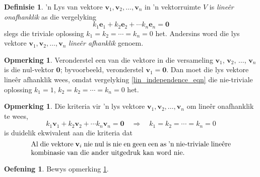 \documentclass[a4paper,11pt]{book}
\theoremstyle{definition}
\newtheorem{definition}[theorem]{Definisie}
\newtheorem{exercise}{Oefening}
\newtheorem{remark}[theorem]{Opmerking}
\newcommand{\be}{\begin{equation}}
\newcommand{\ee}{\end{equation}}
\newcommand{\ve}[1]{\mathbf{#1}}
\begin{document}
\begin{definition} 'n Lys van vektore $\ve{v}_1, \ve{v}_2, \ldots,
	\ve{v}_n$ in 'n vektorruimte $V$ is \emph{line{\^e}r onafhanklik} as
	die vergelyking
	\be \label{lin_independence_eqn}
	k_1 \ve{e}_1 + k_2 \ve{e}_2 + \cdots k_n \ve{e}_n = \ve{0}
	\ee
	slegs die triviale oplossing $k_1 = k_2 = \cdots = k_n = 0$ het.
	Andersins word die lys vektore $\ve{v}_1, \ve{v}_2, \ldots, \ve{v}_n$
	\emph{line{\^e}r afhanklik} genoem.
\end{definition}
\begin{remark} Veronderstel een van die vektore in die versameling
	$\ve{v}_1$, $\ve{v}_2$, $\ldots$, $\ve{v}_n$ is die nul-vektor
	$\ve{0}$; byvoorbeeld, veronderstel $\ve{v}_1 = \ve{0}$. Dan moet die
	lys vektore line{\^e}r afhanklik wees, omdat vergelyking
	\eqref{lin_independence_eqn} die nie-triviale oplossing $k_1 = 1$, $k_2
	= k_2 = \cdots = k_n = 0$ het. \label{remark_about_lin_dependence}
\end{remark}

\begin{remark}
	\label{crit_ind} Die kriteria vir 'n lys vektore $\ve{v}_1, \ve{v}_2,
	\ldots, \ve{v}_n$ om line{\^e}r onafhanklik te wees,
	\[
		k_1 \ve{v}_1 + k_2 \ve{v}_2 + \cdots k_n \ve{v}_n = \ve{0} \quad
		\Rightarrow \quad k_1 = k_2 = \cdots = k_n = 0
	\]
	is duidelik ekwivalent aan die kriteria dat
	\[
		\begin{minipage}{10cm} 
			{ 
			Al die vektore $\ve{v}_i$ nie nul is nie en geen een as 'n
			nie-triviale line{\^e}re kombinasie van die ander uitgedruk kan
			word nie.
			}
		\end{minipage}
	\]
\end{remark}
\begin{exercise}
	Bewys opmerking \ref{crit_ind}.
\end{exercise}
\end{document}
